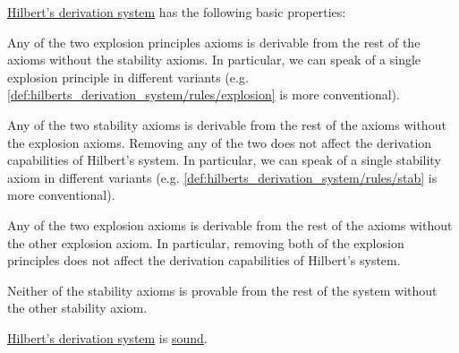 \begin{proposition}\label{thm:hiblerts_derivation_system_properties}
  \hyperref[def:hilberts_derivation_system]{Hilbert's derivation system} has the following basic properties:

  \begin{PropEnum}
     Any of the two explosion principles axioms is derivable from the rest of the axioms without the stability axioms. In particular, we can speak of a single explosion principle in different variants (e.g. \eqref{def:hilberts_derivation_system/rules/explosion} is more conventional).

     Any of the two stability axioms is derivable from the rest of the axioms without the explosion axioms. Removing any of the two does not affect the derivation capabilities of Hilbert's system. In particular, we can speak of a single stability axiom in different variants (e.g. \eqref{def:hilberts_derivation_system/rules/stab} is more conventional).

     Any of the two explosion axioms is derivable from the rest of the axioms without the other explosion axiom. In particular, removing both of the explosion principles does not affect the derivation capabilities of Hilbert's system.

     Neither of the stability axioms is provable from the rest of the system without the other stability axiom.
  \end{PropEnum}
\end{proposition}

\begin{theorem}\label{thm:soundness_of_hilbers_derivation_system}
  \hyperref[def:hilberts_derivation_system]{Hilbert's derivation system} is \hyperref[def:derivability_and_satisfiability/soundness]{sound}.
\end{theorem}

